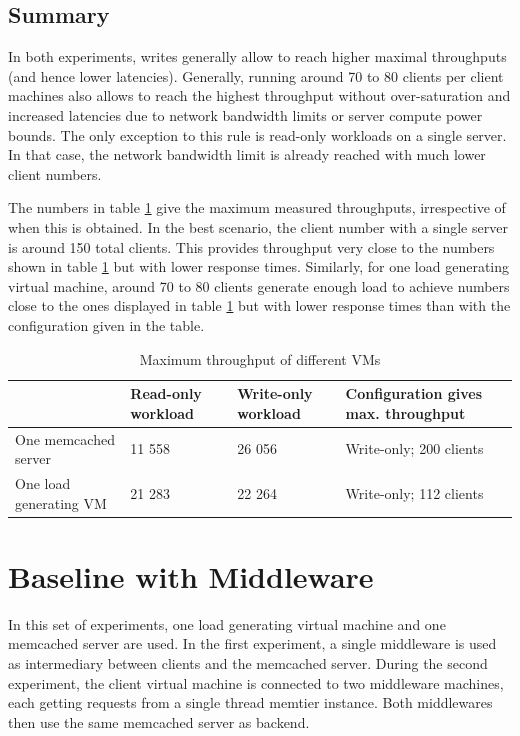 \documentclass[11pt,a4paper]{article}
\begin{document}
\subsection{Summary}
In both experiments, writes generally allow to reach higher maximal throughputs (and hence lower latencies). Generally, running around 70 to 80 clients per client machines also allows to reach the highest throughput without over-saturation and increased latencies due to network bandwidth limits or server compute power bounds. The only exception to this rule is read-only workloads on a single server. In that case, the network bandwidth limit is already reached with much lower client numbers.

The numbers in table \ref{table::max_through_section_2} give the maximum measured throughputs, irrespective of when this is obtained. In the best scenario, the client number with a single server is around 150 total clients. This provides throughput very close to the numbers shown in table \ref{table::max_through_section_2} but with lower response times. Similarly, for one load generating virtual machine, around 70 to 80 clients generate enough load to achieve numbers close to the ones displayed in table \ref{table::max_through_section_2} but with lower response times than with the configuration given in the table.

\begin{table}[!h]
    \centering
    \begin{tabular}{|l|p{2cm}|p{2cm}|p{4cm}|}
        \hline                        & Read-only workload & Write-only workload & Configuration gives max. throughput \\
        \hline One memcached server   &             11 558 &              26 056 &             Write-only; 200 clients \\
        \hline One load generating VM &             21 283 &              22 264 &             Write-only; 112 clients \\
        \hline
    \end{tabular}
    \caption{Maximum throughput of different VMs}
    \label{table::max_through_section_2}
\end{table}



\newpage

\section{Baseline with Middleware \label{section::net_queues}}
In this set of experiments, one load generating virtual machine and one memcached server are used. In the first experiment, a single middleware is used as intermediary between clients and the memcached server. During the second experiment, the client virtual machine is connected to two middleware machines, each getting requests from a single thread memtier instance. Both middlewares then use the same memcached server as backend.
\end{document}
